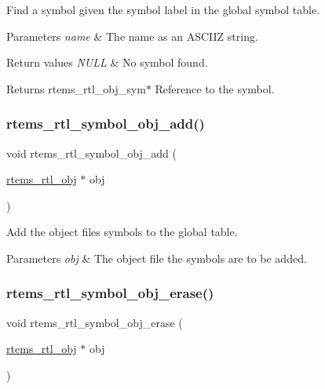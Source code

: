 Find a symbol given the symbol label in the global symbol table.


\begin{DoxyParams}{Parameters}
{\em name} & The name as an A\+S\+C\+I\+IZ string. \\
\hline
\end{DoxyParams}

\begin{DoxyRetVals}{Return values}
{\em N\+U\+LL} & No symbol found. \\
\hline
\end{DoxyRetVals}
\begin{DoxyReturn}{Returns}
rtems\+\_\+rtl\+\_\+obj\+\_\+sym$\ast$ Reference to the symbol. 
\end{DoxyReturn}
\mbox{\label{rtl-sym_8h_abd7450ebf4df51019720c76de3823460}} 
\subsubsection{\texorpdfstring{rtems\_rtl\_symbol\_obj\_add()}{rtems\_rtl\_symbol\_obj\_add()}}
{\footnotesize\ttfamily void rtems\+\_\+rtl\+\_\+symbol\+\_\+obj\+\_\+add (\begin{DoxyParamCaption}\item[{\mbox{\hyperlink{structrtems__rtl__obj}{rtems\+\_\+rtl\+\_\+obj}} $\ast$}]{obj }\end{DoxyParamCaption})}

Add the object file\textquotesingle{}s symbols to the global table.


\begin{DoxyParams}{Parameters}
{\em obj} & The object file the symbols are to be added. \\
\hline
\end{DoxyParams}
\mbox{\label{rtl-sym_8h_adf65b8fa73ea388857082a79e437767a}} 
\subsubsection{\texorpdfstring{rtems\_rtl\_symbol\_obj\_erase()}{rtems\_rtl\_symbol\_obj\_erase()}}
{\footnotesize\ttfamily void rtems\+\_\+rtl\+\_\+symbol\+\_\+obj\+\_\+erase (\begin{DoxyParamCaption}\item[{\mbox{\hyperlink{structrtems__rtl__obj}{rtems\+\_\+rtl\+\_\+obj}} $\ast$}]{obj }\end{DoxyParamCaption})}


